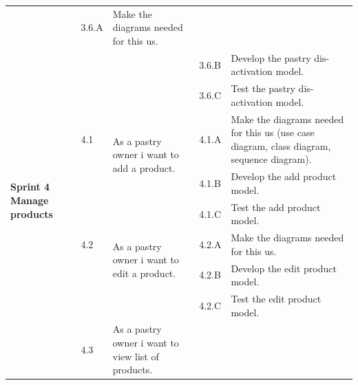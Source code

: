 \documentclass[12pt,a4paper]{report}
\begin{document}
\begin{table}[H]
\begin{center}
\begin{tabular}{|  p{3cm}|  p{1cm}| p{4cm}|  p{1cm}| p{6cm}|}
				&				                      
				3.6.A &                        
				Make the diagrams needed for this \ac{us}.
				\\ 
				\cline{4-5}    
				&                   
				&                                 
				&                        
				3.6.B &                        
				Develop the pastry dis-activation model.
				\\ 
				\cline{4-5}    
				&                   
				&                                 
				&                        
				3.6.C &                        
				Test the pastry dis-activation model.
			
				\\
				 \hline
				\multirow{5}{3cm}{\textbf{Sprint 4} \textbf{Manage products} }
				&                       
				4.1  &  
				\multirow{2}{4cm}{As a pastry owner i want to add a product.}
				
				&				                      
				4.1.A &                        
				Make the diagrams needed for this \ac{us} (use case diagram, class diagram, sequence diagram).
				\\ 
				\cline{4-5}    
				&                   
				&                                 
				&                        
				4.1.B &                        
				Develop the add product model.
				\\ 
				\cline{4-5}    
				&                   
				&                                 
				&                        
				4.1.C &                        
				Test the add product model.
				\\
				\cline{2-5}  
				
				&                       
				4.2  &  
				\multirow{2}{4cm}{As a pastry owner i want to edit a product.}
				
				&				                      
				4.2.A &                        
				Make the diagrams needed for this \ac{us}.
				\\ 
				\cline{4-5}    
				&                   
				&                                 
				&                        
				4.2.B &                        
				Develop the edit product model.
				\\ 
				\cline{4-5}    
				&                   
				&                                 
				&                        
				4.2.C &                        
				Test the edit product model.
				\\
				\cline{2-5}  
				
				&                       
				4.3  &  
				\multirow{2}{4cm}{As a pastry owner i want to view list of products.}
				

\end{tabular}
\end{center}
\end{table}
\end{document}
